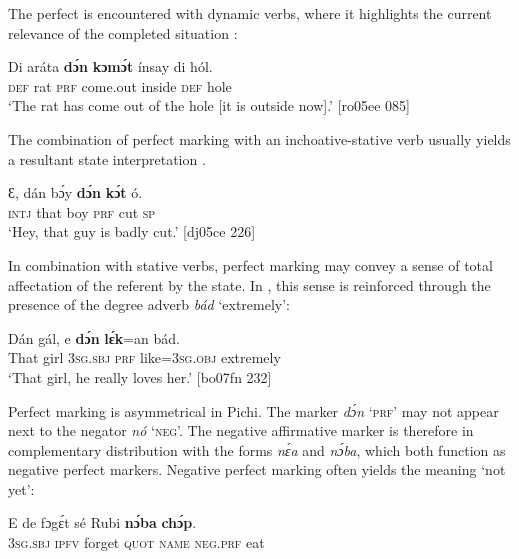 The perfect is encountered with dynamic verbs, where it highlights the current relevance of the completed situation :



\ea%
    \label{ex:key:392}
    \gll Di  aráta  \textbf{dɔ́n}  \textbf{kɔmɔ́t}    ínsay  di  hól.\\
\textsc{def}  rat    \textsc{prf}  come.out  inside  \textsc{def}  hole\\

\glt ‘The rat has come out of the hole [it is outside now].’ [ro05ee 085]
\z

The combination of perfect marking with an inchoative-stative verb usually yields a resultant state interpretation . 


\ea%
    \label{ex:key:393}
    \gll Ɛ,  dán    bɔ́y    \textbf{dɔ́n}  \textbf{kɔ́t}  ó.\\
\textsc{intj}  that    boy    \textsc{prf}  cut  \textsc{sp}\\

\glt ‘Hey, that guy is badly cut.’ [dj05ce 226]
\z

In combination with stative verbs, perfect marking may convey a sense of total affectation of the referent by the state. In , this sense is reinforced through the presence of the degree adverb \textit{bád} ‘extremely’:


\ea%
    \label{ex:key:394}
    \gll Dán    gál,  e    \textbf{dɔ́n}    \textbf{lɛ́k}=an    bád.\\
That  girl  \textsc{3sg.sbj}  \textsc{prf}    like=\textsc{3sg.obj}  extremely\\

\glt ‘That girl, he really loves her.’ [bo07fn 232]
\z

Perfect marking is asymmetrical in Pichi. The marker \textit{dɔ́n} ‘\textsc{prf}’ may not appear next to the negator \textit{nó} ‘\textsc{neg}’. The negative affirmative marker is therefore in complementary distribution with the forms \textit{nɛ́a} and \textit{nɔ́ba}, which both function as negative perfect markers. Negative perfect marking often yields the meaning ‘not yet’: 


\ea%
    \label{ex:key:395}
    \gll E    de  fɔgɛ́t  sé    Rubi    \textbf{nɔ́ba}  \textbf{chɔ́p}.\\
\textsc{3sg.sbj}  \textsc{ipfv}  forget  \textsc{quot}    \textsc{name}  \textsc{neg}.\textsc{prf}  eat\\

